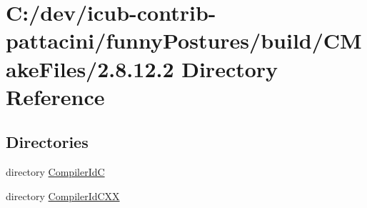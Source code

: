 \section{C\+:/dev/icub-\/contrib-\/pattacini/funny\+Postures/build/\+C\+Make\+Files/2.8.12.2 Directory Reference}
\label{dir_7e53b351c275d2c3d69b5ba8e817c448}
\subsection*{Directories}
\begin{DoxyCompactItemize}
\item 
directory \hyperlink{dir_1b7f6f22a3e20fbc8e3ba4f1af8b1ba0}{Compiler\+Id\+C}
\item 
directory \hyperlink{dir_d20a36fef4db40efda5810daf271cb5d}{Compiler\+Id\+C\+X\+X}
\end{DoxyCompactItemize}
